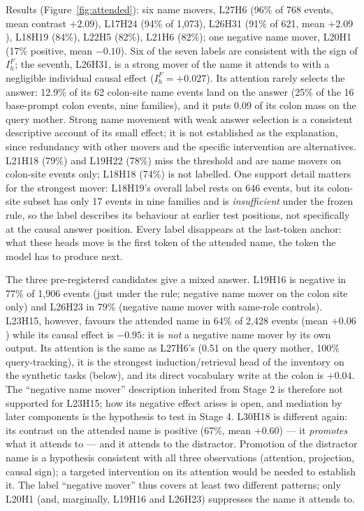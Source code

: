 \documentclass[11pt,a4paper]{article}
\begin{document}
Results (Figure~\ref{fig:attended}): six name movers, L27H6 (96\% of 768 events, mean
contrast $+2.09$), L17H24 (94\% of 1{,}073), L26H31 (91\% of 621, mean $+2.09$),
L18H19 (84\%), L22H5 (82\%), L21H6 (82\%); one negative name mover, L20H1 (17\%
positive, mean $-0.10$). Six of the seven labels are consistent with the sign of
$I^F_h$; the seventh, L26H31, is a strong mover of the name it attends to with a
negligible individual causal effect ($I^F_h=+0.027$). Its attention rarely selects the
answer: 12.9\% of its 62 colon-site name events land on the answer (25\% of the 16
base-prompt colon events, nine families), and it puts 0.09 of its colon mass on the
query mother. Strong name movement with weak answer selection is a consistent
descriptive account of its small effect; it is not established as the explanation,
since redundancy with other movers and the specific intervention are alternatives.
L21H18 (79\%) and L19H22 (78\%) miss the threshold and are name movers on colon-site
events only; L18H18 (74\%) is not labelled. One support detail matters for the
strongest mover: L18H19's overall label rests on 646 events, but its colon-site subset
has only 17 events in nine families and is \emph{insufficient} under the frozen rule,
so the label describes its behaviour at earlier test positions, not specifically at
the causal answer position. Every label disappears at the last-token anchor: what these heads move is the
first token of the attended name, the token the model has to produce next.

The three pre-registered candidates give a mixed answer. L19H16 is negative in 77\% of
1{,}906 events (just under the rule; negative name mover on the colon site only) and
L26H23 in 79\% (negative name mover with same-role controls). L23H15, however, favours
the attended name in 64\% of 2{,}428 events (mean $+0.06$) while its causal effect is
$-0.95$: it is \emph{not} a negative name mover by its own output. Its attention is the
same as L27H6's (0.51 on the query mother, 100\% query-tracking), it is the strongest
induction/retrieval head of the inventory on the synthetic tasks (below), and its
direct vocabulary write at the colon is $+0.04$. The ``negative name mover''
description inherited from Stage 2 is therefore not supported for L23H15; how its
negative effect arises is open, and mediation by later components is the hypothesis to
test in Stage 4. L30H18 is different again: its contrast on the attended name is
positive (67\%, mean $+0.60$) --- it \emph{promotes} what it attends to --- and it
attends to the distractor. Promotion of the distractor name is a hypothesis consistent
with all three observations (attention, projection, causal sign); a targeted
intervention on its attention would be needed to establish it. The label ``negative
mover'' thus covers at least two different patterns; only L20H1 (and, marginally,
L19H16 and L26H23) suppresses the name it attends to.
\end{document}
